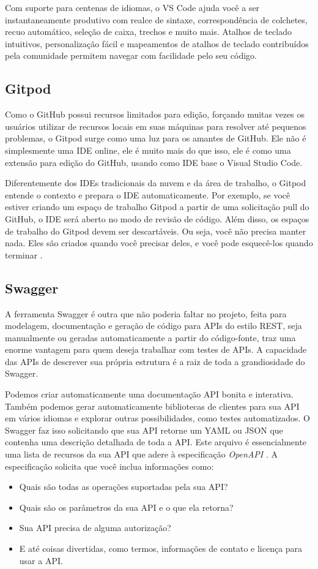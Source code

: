 Com suporte para centenas de idiomas, o VS Code ajuda você a ser instantaneamente produtivo com realce de sintaxe, correspondência de colchetes, recuo automático, seleção de caixa, trechos e muito mais. Atalhos de teclado intuitivos, personalização fácil e mapeamentos de atalhos de teclado contribuídos pela comunidade permitem navegar com facilidade pelo seu código. \cite{mjbvz2020VSCode}


\subsection{Gitpod}
Como o GitHub possui recursos limitados para edição, forçando muitas vezes os usuários utilizar de recursos locais em suas máquinas para resolver até pequenos problemas, o Gitpod surge como uma luz para os amantes de GitHub. Ele não é simplesmente uma IDE online, ele é muito mais do que isso, ele é como uma extensão para edição do GitHub, usando como IDE base o Visual Studio Code. 

Diferentemente dos IDEs tradicionais da nuvem e da área de trabalho, o Gitpod entende o contexto e prepara o IDE automaticamente. Por exemplo, se você estiver criando um espaço de trabalho Gitpod a partir de uma solicitação pull do GitHub, o IDE será aberto no modo de revisão de código. Além disso, os espaços de trabalho do Gitpod devem ser descartáveis. Ou seja, você não precisa manter nada. Eles são criados quando você precisar deles, e você pode esquecê-los quando terminar \cite{jankeromnes2020Gitpod}. 


\subsection{Swagger}
A ferramenta Swagger é outra que não poderia faltar no projeto, feita para modelagem, documentação e geração de código para APIs do estilo REST, seja manualmente ou geradas automaticamente a partir do código-fonte, traz uma enorme vantagem para quem deseja trabalhar com testes de APIs. A capacidade das APIs de descrever sua própria estrutura é a raiz de toda a grandiosidade do Swagger.

Podemos criar automaticamente uma documentação API bonita e interativa. Também podemos gerar automaticamente bibliotecas de clientes para sua API em vários idiomas e explorar outras possibilidades, como testes automatizados. O Swagger faz isso solicitando que sua API retorne um YAML ou JSON que contenha uma descrição detalhada de toda a API. Este arquivo é essencialmente uma lista de recursos da sua API que adere à especificação \textit{OpenAPI} \cite{shockey2020Swagger}. A especificação solicita que você inclua informações como:

\begin{itemize}
    \item Quais são todas as operações suportadas pela sua API? 
    \item Quais são os parâmetros da sua API e o que ela retorna?   
    \item Sua API precisa de alguma autorização?
    \item E até coisas divertidas, como termos, informações de contato e licença para usar a API.
\end{itemize}

\
